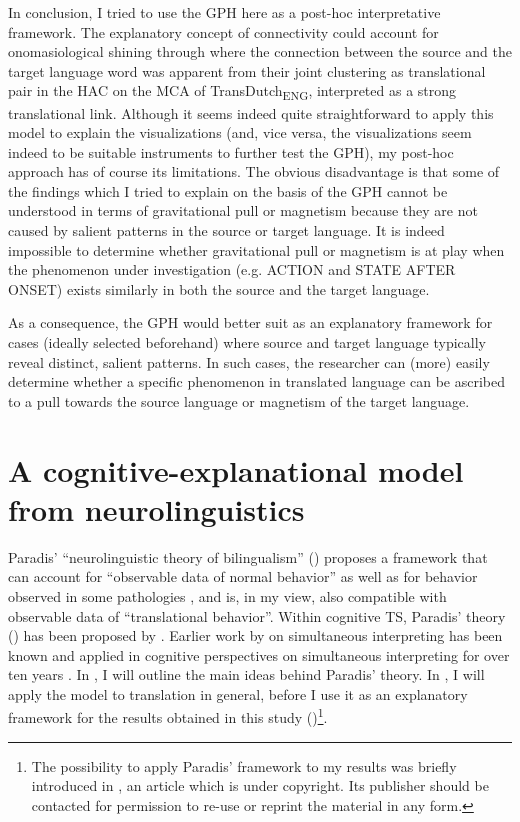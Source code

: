 In conclusion, I tried to use the GPH here as a post-hoc interpretative framework. The explanatory concept of connectivity could account for onomasiological shining through where the connection between the source and the target language word was apparent from their joint clustering as translational pair in the HAC on the MCA of TransDutch\textsubscript{ENG}, interpreted as a strong translational link. Although it seems indeed quite straightforward to apply this model to explain the visualizations (and, vice versa, the visualizations seem indeed to be suitable instruments to further test the GPH), my post-hoc approach has of course its limitations. The obvious disadvantage is that some of the findings which I tried to explain on the basis of the GPH cannot be understood in terms of gravitational pull or magnetism because they are not caused by salient patterns in the source or target language. It is indeed impossible to determine whether gravitational pull or magnetism is at play when the phenomenon under investigation (e.g. ACTION and STATE AFTER ONSET) exists similarly in both the source and the target language.

As a consequence, the GPH would better suit as an explanatory framework for cases (ideally selected beforehand) where source and target language typically reveal distinct, salient patterns. In such cases, the researcher can (more) easily determine whether a specific phenomenon in translated language can be ascribed to a pull towards the source language or magnetism of the target language.

\section{A cognitive-explanational model from neurolinguistics}
\label{sec:5.3}  
Paradis’ “neurolinguistic theory of bilingualism” (\citeyear{paradis_neurolinguistic_2004}) proposes a framework that can account for “observable data of normal behavior” as well as for behavior observed in some pathologies \citep[225]{paradis_neurolinguistic_2004}, and is, in my view, also compatible with observable data of “translational behavior”. Within cognitive TS, Paradis’ theory (\citeyear{paradis_neurolinguistic_2004}) has been proposed by \citet{house_towards_2013}. Earlier work by \citet{ellis_neurolinguistic_1994, englund_dimitrova_prerequisites_2000} on simultaneous interpreting has been known and applied in cognitive perspectives on simultaneous interpreting for over ten years \citep{christoffels_cognitive_2004, kroll_simultaneous_2005, de_groot_language_2006}. In , I will outline the main ideas behind Paradis’ theory. In , I will apply the model to translation in general, before I use it as an explanatory framework for the results obtained in this study ()\footnote{The possibility to apply Paradis’ framework to my results was briefly introduced in \citet{VandevoordeEtAl2017}, an article which is under copyright. Its publisher should be contacted for permission to re-use or reprint the material in any form.}.

